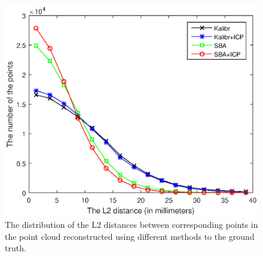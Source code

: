 \begin{figure}[ht]
	\centering
	\includegraphics[width=\columnwidth]{image/distribution.eps}
	\caption{The distribution of the L2 distances between corresponding points in the point cloud reconstructed using different methods to the ground truth.}
	\label{fig:error-distribution}
\end{figure}

